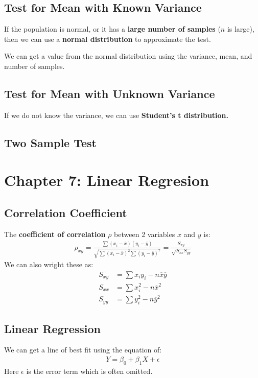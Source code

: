 \documentclass[12pt,letterpaper]{article} \usepackage{amsmath} \usepackage{graphicx} \usepackage[margin=1in]{geometry} \usepackage{longtable}  \usepackage{amssymb}
\begin{document}
	\subsection{Test for Mean with Known Variance}
	If the population is normal, or it has a \textbf{large number of samples} ($n$ is large), then we can use a \textbf{normal distribution} to approximate the test. 
	
	We can get a value from the normal distribution using the variance, mean, and number of samples. 
	
	\subsection{Test for Mean with Unknown Variance}
	If we do not know the variance, we can use \textbf{Student's t distribution.}
	
	\subsection{Two Sample Test}
	
	\section{Chapter 7: Linear Regresion}
	
	\subsection{Correlation Coefficient}
	The \textbf{coefficient of correlation} $\rho$ between 2 variables $x$ and $y$ is:
	\begin{align*}
		\rho_{xy} = \frac{\sum (x_i-\overline x)(y_i-\overline y)}{\sqrt{\sum (x_i - \overline x)^2 \sum(y_i - \overline y)^2}} = \frac{S_{xy}}{\sqrt{S_{xx}S_{yy}}}
	\end{align*}
	We can also wright these as:
	\begin{align*}
		S_{xy} &= \sum x_iy_i - n\overline x \overline y\\
		S_{xx} &= \sum x_i^2 - n\overline x ^2\\
		S_{yy} &= \sum y_i^2 - n\overline y ^2
	\end{align*}
	
	\subsection{Linear Regression}
	We can get a line of best fit using the equation of:
	\begin{align*}
		Y = \beta_0 + \beta_1 X+ \epsilon
	\end{align*}
	Here $\epsilon$ is the error term which is often omitted. 
	
\end{document}
